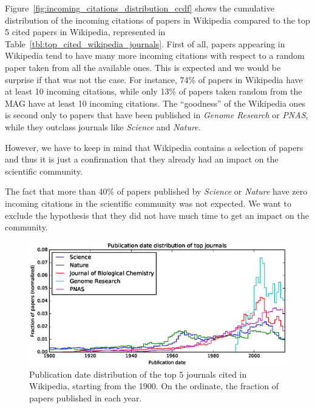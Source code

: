 Figure~\ref{fig:incoming_citations_distribution_ccdf} shows the cumulative distribution of the incoming citations of papers in Wikipedia compared to the top 5 cited papers in Wikipedia, represented in Table~\ref{tbl:top_cited_wikipedia_journals}.
First of all, papers appearing in Wikipedia tend to have many more incoming citations with respect to a random paper taken from all the available ones.
This is expected and we would be surprise if that was not the case.
For instance, 74\% of papers in Wikipedia have at least 10 incoming citations, while only 13\% of papers taken random from the \ac{MAG} have at least 10 incoming citations.
The ``goodness'' of the Wikipedia ones is second only to papers that have been published in \emph{Genome Research} or \emph{PNAS}, while they outclass journals like \emph{Science} and \emph{Nature}.

However, we have to keep in mind that Wikipedia contains a selection of papers and thus it is just a confirmation that they already had an impact on the scientific community.

The fact that more than 40\% of papers published by \emph{Science} or \emph{Nature} have zero incoming citations in the scientific community was not expected.
We want to exclude the hypothesis that they did not have much time to get an impact on the community.

\begin{figure}[h]
\centering
\includegraphics[keepaspectratio=true, width=\textwidth]{assets/publication_date_distribution_journals}
\caption{Publication date distribution of the top 5 journals cited in Wikipedia, starting from the 1900.
On the ordinate, the fraction of papers published in each year.}
\label{fig:publication_date_distribution_journals}
\end{figure}

